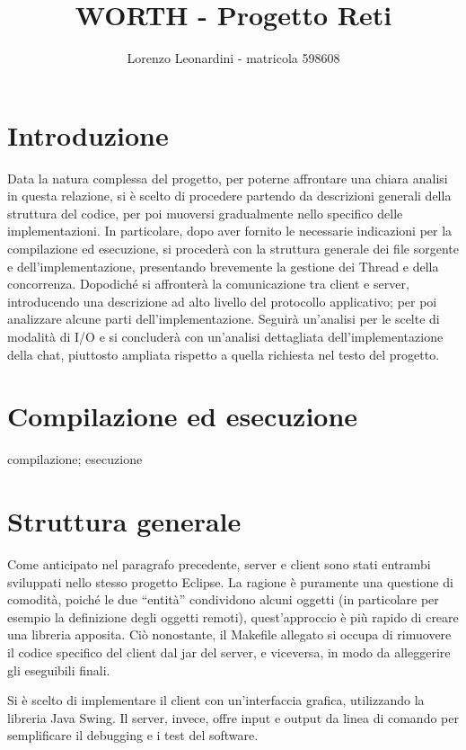 \documentclass[a4paper,11pt] {article}
\title{\textbf{WORTH - Progetto Reti}}
\author{Lorenzo Leonardini - matricola 598608}
\date{}
\begin{document}
\maketitle

\section*{Introduzione}

Data la natura complessa del progetto, per poterne affrontare una chiara analisi in questa relazione, si è scelto di procedere partendo da descrizioni generali della struttura del codice, per poi muoversi gradualmente nello specifico delle implementazioni. In particolare, dopo aver fornito le necessarie indicazioni per la compilazione ed esecuzione, si procederà con la struttura generale dei file sorgente e dell'implementazione, presentando brevemente la gestione dei Thread e della concorrenza. Dopodiché si affronterà la comunicazione tra client e server, introducendo una descrizione ad alto livello del protocollo applicativo; per poi analizzare alcune parti dell'implementazione. Seguirà un'analisi per le scelte di modalità di I/O e si concluderà con un'analisi dettagliata dell'implementazione della chat, piuttosto ampliata rispetto a quella richiesta nel testo del progetto.

\section*{Compilazione ed esecuzione}

compilazione; esecuzione

\section*{Struttura generale}

Come anticipato nel paragrafo precedente, server e client sono stati entrambi sviluppati nello stesso progetto Eclipse. La ragione è puramente una questione di comodità, poiché le due ``entità'' condividono alcuni oggetti (in particolare per esempio la definizione degli oggetti remoti), quest'approccio è più rapido di creare una libreria apposita. Ciò nonostante, il Makefile allegato si occupa di rimuovere il codice specifico del client dal jar del server, e viceversa, in modo da alleggerire gli eseguibili finali.

Si è scelto di implementare il client con un'interfaccia grafica, utilizzando la libreria Java Swing. Il server, invece, offre input e output da linea di comando per semplificare il debugging e i test del software.
\end{document}
